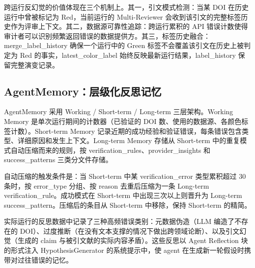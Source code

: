 \documentclass[11pt,a4paper]{ctexart}
\begin{document}
跨运行反幻觉的价值体现在三个机制上。其一，引文模式检测：当某 DOI 在历史运行中曾被标记为 Red，当前运行的 Multi-Reviewer 会收到该引文的完整标签历史作为评审上下文。其二，数据源可靠性追踪：跨运行累积的 API 错误计数使得审计者可以识别频繁返回错误的数据提供方。其三，标签历史融合：merge\_label\_history 确保一个运行中的 Green 标签不会覆盖该引文在历史上被判定为 Red 的事实，latest\_color\_label 始终反映最新运行结果，label\_history 保留完整演变记录。

\subsection{AgentMemory：层级化反思记忆}

AgentMemory 采用 Working / Short-term / Long-term 三层架构。Working Memory 是单次运行期间的计数器（已验证的 DOI 数、使用的数据源、各颜色标签计数）。Short-term Memory 记录近期的成功经验和验证错误，每条错误包含类型、详细原因和发生上下文。Long-term Memory 存储从 Short-term 中的重复模式自动压缩而来的规则，按 verification\_rules、provider\_insights 和 success\_patterns 三类分文件存储。

自动压缩的触发条件是：当 Short-term 中某 verification\_error 类型累积超过 30 条时，按 error\_type 分组、按 reason 去重后压缩为一条 Long-term verification\_rule。成功模式在 Short-term 中出现三次以上则晋升为 Long-term success\_pattern。压缩后的条目从 Short-term 中移除，保持 Short-term 的精简。

实际运行的反思数据中记录了三种高频错误类别：元数据伪造（LLM 编造了不存在的 DOI）、过度推断（在没有文本支撑的情况下做出跨领域论断）、以及引文幻觉（生成的 claim 与被引文献的实际内容矛盾）。这些反思以 Agent Reflection 块的形式注入 HypothesisGenerator 的系统提示中，使 agent 在生成新一轮假设时携带对过往错误的记忆。
\end{document}
